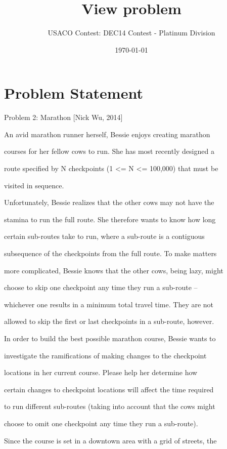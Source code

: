 \documentclass[12pt]{article}
\title{View problem}
\author{USACO Contest: DEC14 Contest - Platinum Division}
\date{\today}
\begin{document}
\maketitle

\section*{Problem Statement}

Problem 2: Marathon [Nick Wu, 2014]



An avid marathon runner herself, Bessie enjoys creating marathon

courses for her fellow cows to run.  She has most recently designed a

route specified by N checkpoints (1 <= N <= 100,000) that must be

visited in sequence.



Unfortunately, Bessie realizes that the other cows may not have the

stamina to run the full route. She therefore wants to know how long

certain sub-routes take to run, where a sub-route is a contiguous

subsequence of the checkpoints from the full route.  To make matters

more complicated, Bessie knows that the other cows, being lazy, might

choose to skip one checkpoint any time they run a sub-route --

whichever one results in a minimum total travel time.  They are not

allowed to skip the first or last checkpoints in a sub-route, however.



In order to build the best possible marathon course, Bessie wants to

investigate the ramifications of making changes to the checkpoint

locations in her current course.  Please help her determine how

certain changes to checkpoint locations will affect the time required

to run different sub-routes (taking into account that the cows might

choose to omit one checkpoint any time they run a sub-route).



Since the course is set in a downtown area with a grid of streets, the
\end{document}
